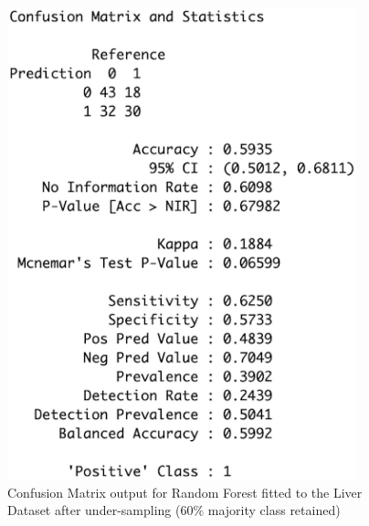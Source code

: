 \begin{figure}[!htbp]
\begin{minipage}{0.45\textwidth}
        \includegraphics[width=0.9\textwidth]{ThesisTemplate/appendix/images/Chapter5Appendix/ConfusionMatrix60/Liver.png}
        \caption{Confusion Matrix output for Random Forest fitted to the Liver Dataset after under-sampling (60\% majority class retained)}
        \label{fig:matrixLiver60}
    \end{minipage}
\end{figure}

